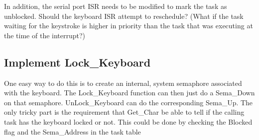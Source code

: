 \documentclass{article}
\begin{document}
In addition, the serial port ISR needs to be modified to mark the task as unblocked. Should the
keyboard ISR attempt to reschedule? (What if the task waiting for the keystroke is higher in
priority than the task that was executing at the time of the interrupt?)

\subsection{Implement Lock\_Keyboard}

One easy way to do this is to create an internal, system semaphore associated with the keyboard.
The Lock\_Keyboard function can then just do a Sema\_Down on that semaphore. UnLock\_Keyboard
can do the corresponding Sema\_Up. The only tricky part is the requirement that Get\_Char be
able to tell if the calling task has the keyboard locked or not. This could be done by checking
the Blocked flag and the Sema\_Address in the task table
\end{document}
